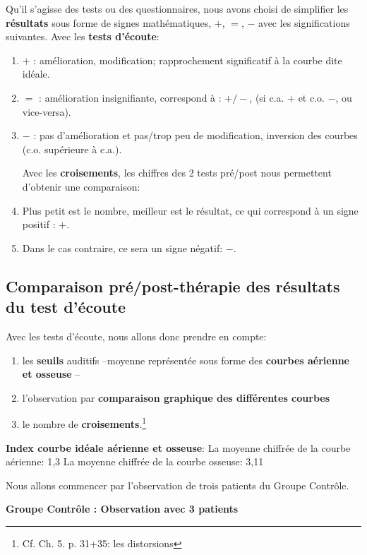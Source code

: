 Qu'il s'agisse des tests ou des questionnaires, nous avons choisi de
simplifier les \textbf{résultats} sous forme de signes
mathématiques, $+$, $=$, $-$ avec les significations suivantes.
Avec les \textbf{tests d'écoute}: 
\begin{enumerate}
\item$+$   : amélioration, modification;  rapprochement significatif à la courbe dite idéale.
\item$=$   : amélioration insignifiante, correspond à : $+/-$, (si c.a. $ + $ et c.o. $-$, ou vice-versa).

\item$-$   : pas d'amélioration et pas/trop peu  de modification, inversion
des courbes (c.o. supérieure à c.a.). 

  Avec les \textbf{croisements}, les chiffres des 2 tests pré/post
  nous permettent d'obtenir une comparaison: 
  \item Plus petit est le nombre, meilleur est le résultat, ce qui correspond à un signe positif : $+$.
\item Dans le
  cas contraire, ce sera un signe négatif: $-$.
  
\end{enumerate}


 \subsection{ Comparaison pré/post-thérapie des résultats du test d'écoute}
Avec les tests d'écoute, nous 
allons donc prendre en compte:

\begin{enumerate}
 \item   les \textbf{seuils} auditifs --moyenne
représentée sous forme des \textbf{courbes aérienne et osseuse} --
\item  l'observation par \textbf{comparaison graphique des différentes
  courbes}
\item le nombre de
\textbf{croisements}.\footnote{Cf. Ch. 5. p. 31+35: les distorsions}
 
\end{enumerate}


\textbf{Index courbe idéale aérienne et osseuse}:
La moyenne chiffrée de la courbe aérienne: 1,3
La moyenne chiffrée de la courbe osseuse: 3,11


  Nous allons commencer par l'observation de trois patients du Groupe Contrôle.
     

      \textbf{Groupe Contrôle : Observation avec 3 patients}
